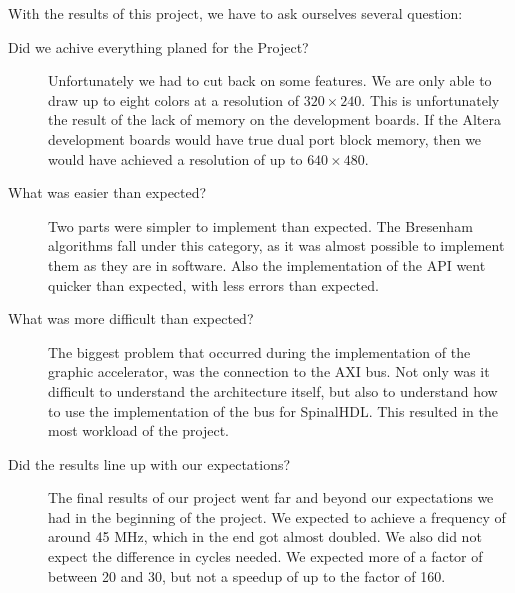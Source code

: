 With the results of this project, we have to ask ourselves several question:

\begin{description}
	\item[Did we achive everything planed for the Project?] Unfortunately we had to cut back on some features. We are only able to draw up to eight colors at a resolution of \(320 \times 240\). This is unfortunately the result of the lack of memory on the development boards. If the Altera development boards would have true dual port block memory, then we would have achieved a resolution of up to \(640 \times 480\).
	\item[What was easier than expected?] Two parts were simpler to implement than expected. The Bresenham algorithms fall under this category, as it was almost possible to implement them as they are in software. Also the implementation of the API went quicker than expected, with less errors than expected.
	\item[What was more difficult than expected?] The biggest problem that occurred during the implementation of the graphic accelerator, was the connection to the AXI bus. Not only was it difficult to understand the architecture itself, but also to understand how to use the implementation of the bus for SpinalHDL. This resulted in the most workload of the project.
	\item[Did the results line up with our expectations?] The final results of our project went far and beyond our expectations we had in the beginning of the project. We expected to achieve a frequency of around 45 MHz, which in the end got almost doubled. We also did not expect the difference in cycles needed. We expected more of a factor of between 20 and 30, but not a speedup of up to the factor of 160.
\end{description}

